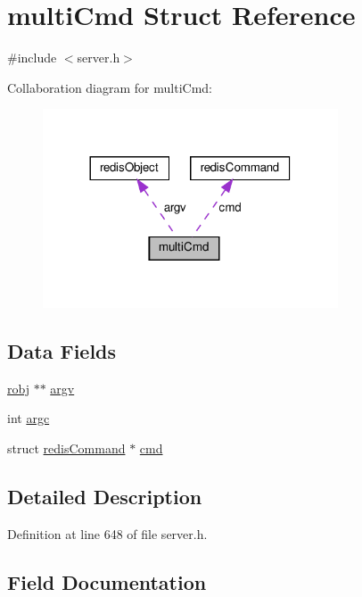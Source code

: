 \hypertarget{structmulti_cmd}{}\section{multi\+Cmd Struct Reference}
\label{structmulti_cmd}


{\ttfamily \#include $<$server.\+h$>$}



Collaboration diagram for multi\+Cmd\+:
\nopagebreak
\begin{figure}[H]
\begin{center}
\leavevmode
\includegraphics[width=248pt]{structmulti_cmd__coll__graph}
\end{center}
\end{figure}
\subsection*{Data Fields}
\begin{DoxyCompactItemize}
\item 
\hyperlink{server_8h_a540f174d2685422fbd7d12e3cd44c8e2}{robj} $\ast$$\ast$ \hyperlink{structmulti_cmd_a5c75dd3cb8eb8a3f5be7d4fdf48a9ef9}{argv}
\item 
int \hyperlink{structmulti_cmd_ad1447518f4372828b8435ae82e48499e}{argc}
\item 
struct \hyperlink{structredis_command}{redis\+Command} $\ast$ \hyperlink{structmulti_cmd_a8ed6c4d0c6382ad1787b32d10db25c5e}{cmd}
\end{DoxyCompactItemize}


\subsection{Detailed Description}


Definition at line 648 of file server.\+h.



\subsection{Field Documentation}
\mbox{\label{structmulti_cmd_ad1447518f4372828b8435ae82e48499e}} 
